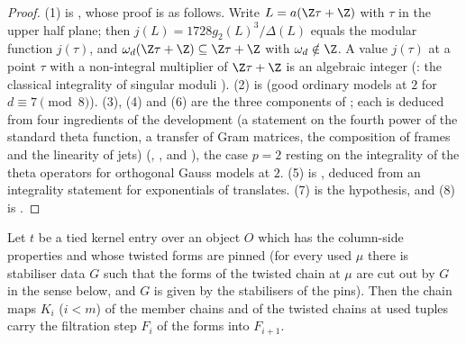 \begin{proof}
(1) is , whose proof is as follows. Write $L=a(\Z\tau+\Z)$ with $\tau$ in the
upper half plane; then $j(L)=1728g_2(L)^3/\Delta(L)$ equals the modular function $j(\tau)$, and
$\omega_d(\Z\tau+\Z)\subseteq\Z\tau+\Z$ with $\omega_d\notin\Z$. A value $j(\tau)$ at a point $\tau$ with a non-integral
multiplier of $\Z\tau+\Z$ is an algebraic integer (: the classical
integrality of singular moduli \cite[Ch.~II, \S6]{Silverman1994}). (2) is
 (good ordinary models at $2$ for
$d\equiv7\pmod8$). (3), (4) and (6) are the three components of ; each is
deduced from four ingredients of the development (a statement on the fourth power of the standard theta function, a
transfer of Gram matrices, the composition of frames and the linearity of jets)
(, , and ),
the case $p=2$ resting on the integrality of the theta operators for orthogonal Gauss models at $2$. (5) is
, deduced from an integrality statement for exponentials of translates.
(7) is the hypothesis, and (8) is .
\end{proof}

\begin{theorem}\label{pf:reckernel:kFi}
Let $t$ be a tied kernel entry over an object $O$ which has the column-side properties and whose twisted forms are pinned
(for every used $\mu$ there is stabiliser data $G$ such that the forms of the twisted chain at $\mu$ are cut out by $G$ in the
sense below, and $G$ is given by the stabilisers of the pins). Then the chain maps $K_i$ ($i<m$) of the member chains and of
the twisted chains at used tuples carry the filtration step $F_i$ of the forms into $F_{i+1}$.
\end{theorem}

